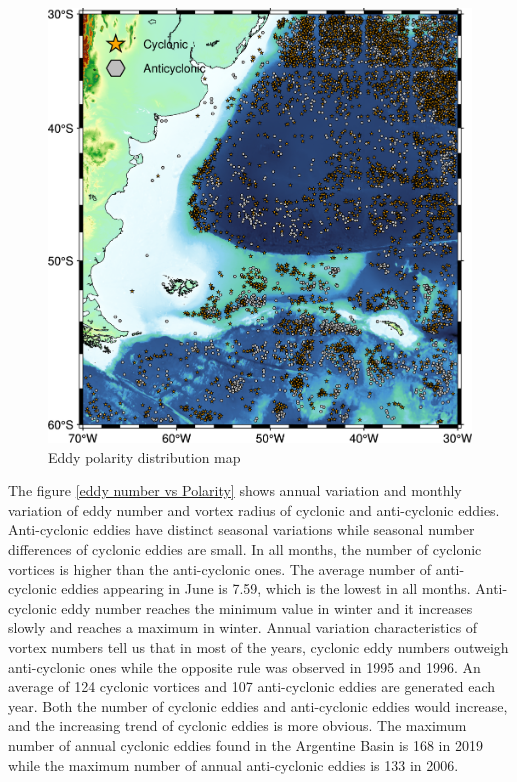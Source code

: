 \begin{figure}
    \centering
    \includegraphics[width = 15cm]{chapter/figure/eddy polarity map.png}
    \caption{Eddy polarity distribution map}
    \label{Eddy polarity map}
\end{figure}

The figure \ref{eddy number vs Polarity} shows annual variation and monthly variation of eddy number and vortex radius of cyclonic and anti-cyclonic eddies. Anti-cyclonic eddies have distinct seasonal variations while seasonal number differences of cyclonic eddies are small. In all months, the number of cyclonic vortices is higher than the anti-cyclonic ones. The average number of anti-cyclonic eddies appearing in June is 7.59, which is the lowest in all months. Anti-cyclonic eddy number reaches the minimum value in winter and it increases slowly and reaches a maximum in winter. Annual variation characteristics of vortex numbers tell us that in most of the years, cyclonic eddy numbers outweigh anti-cyclonic ones while the opposite rule was observed in 1995 and 1996. An average of 124 cyclonic vortices and 107 anti-cyclonic eddies are generated each year. Both the number of cyclonic eddies and anti-cyclonic eddies would increase, and the increasing trend of cyclonic eddies is more obvious. The maximum number of annual cyclonic eddies found in the Argentine Basin is 168 in 2019 while the maximum number of annual anti-cyclonic eddies is 133 in 2006.

